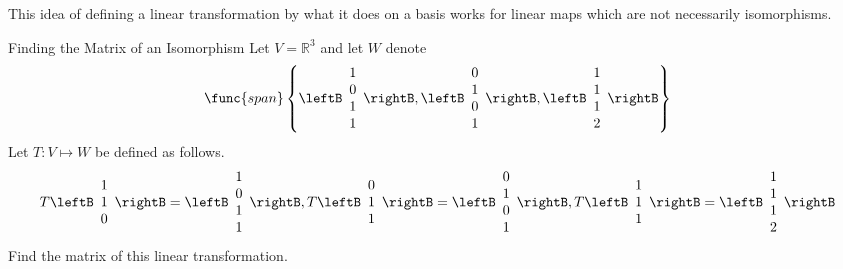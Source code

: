 This idea of defining a linear transformation by what it does on a basis
works for linear maps which are not necessarily isomorphisms.

\begin{example}{Finding the Matrix of an Isomorphism}{}
Let $V=\mathbb{R}^{3}$ and let $W$ denote 
\begin{equation*}
\func{span}\left\{ \leftB
\begin{array}{c}
1 \\ 
0 \\ 
1 \\ 
1
\end{array}
\rightB ,\leftB 
\begin{array}{c}
0 \\ 
1 \\ 
0 \\ 
1
\end{array}
\rightB ,\leftB 
\begin{array}{c}
1 \\ 
1 \\ 
1 \\ 
2
\end{array}
\rightB \right\}
\end{equation*}
Let $T: V \mapsto W$ be defined as follows. 
\begin{equation*}
T\leftB 
\begin{array}{c}
1 \\ 
1 \\ 
0
\end{array}
\rightB = \leftB 
\begin{array}{c}
1 \\ 
0 \\ 
1 \\ 
1
\end{array}
\rightB ,T\leftB 
\begin{array}{c}
0 \\ 
1 \\ 
1
\end{array}
\rightB =\leftB 
\begin{array}{c}
0 \\ 
1 \\ 
0 \\ 
1
\end{array}
\rightB ,T\leftB 
\begin{array}{c}
1 \\ 
1 \\ 
1
\end{array}
\rightB =\leftB 
\begin{array}{c}
1 \\ 
1 \\ 
1 \\ 
2
\end{array}
\rightB
\end{equation*}
 Find the matrix of this linear transformation.
\end{example}

